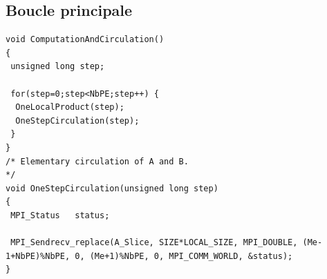\documentclass[	DIV=calc,%
							paper=a4,%
							fontsize=11pt%
							]{scrartcl}	 					%
\begin{document}
\subsection*{Boucle principale}
\begin{lstlisting}
void ComputationAndCirculation()
{
 unsigned long step;
 
 for(step=0;step<NbPE;step++) { 
  OneLocalProduct(step);
  OneStepCirculation(step);
 }
}
/* Elementary circulation of A and B.                                            */
void OneStepCirculation(unsigned long step)
{
 MPI_Status   status;

 MPI_Sendrecv_replace(A_Slice, SIZE*LOCAL_SIZE, MPI_DOUBLE, (Me-1+NbPE)%NbPE, 0, (Me+1)%NbPE, 0, MPI_COMM_WORLD, &status);
}


\end{lstlisting} 
\end{document}
